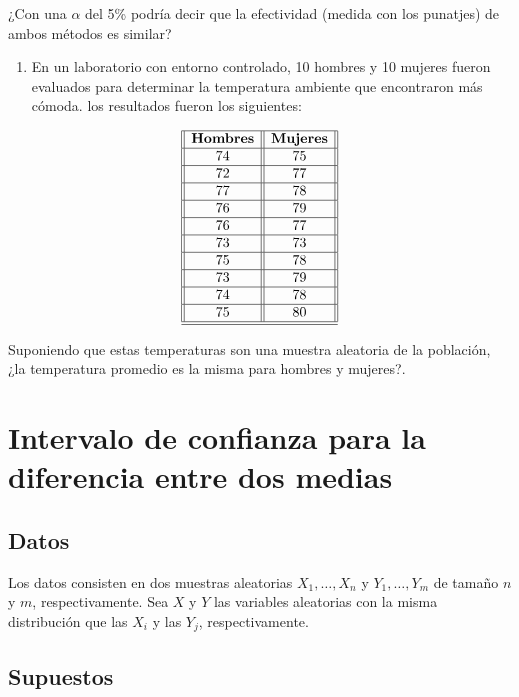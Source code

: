 \documentclass[
  a4paper,
  oneside,
  openany]{book}
\providecommand{\tightlist}{%
  \setlength{\itemsep}{0pt}\setlength{\parskip}{0pt}}
\begin{document}
¿Con una \(\alpha\) del 5\% podría decir que la efectividad (medida con los punatjes) de ambos métodos es similar?

\begin{enumerate}
\def\labelenumi{\arabic{enumi}.}
\setcounter{enumi}{1}
\tightlist
\item
  En un laboratorio con entorno controlado, 10 hombres y 10 mujeres fueron evaluados para determinar la temperatura ambiente que encontraron más cómoda. los resultados fueron los siguientes:
\end{enumerate}

\[
\begin{array}{||c| |c||} 
\hline 
\textbf{Hombres} & \textbf{Mujeres} \\  
 \hline
74&75\\
 \hline
72&77\\
 \hline
77&78\\
 \hline
76&79\\
 \hline
76&77\\
 \hline
73&73\\
 \hline
75&78\\
 \hline
73&79\\
 \hline
74&78\\
 \hline
75&80\\
  \hline
\hline
\end{array}
\]

Suponiendo que estas temperaturas son una muestra aleatoria de la población, ¿la temperatura promedio es la misma para hombres y mujeres?.

\hypertarget{intervalo-de-confianza-para-la-diferencia-entre-dos-medias}{%
\chapter{Intervalo de confianza para la diferencia entre dos medias}\label{intervalo-de-confianza-para-la-diferencia-entre-dos-medias}}

\hypertarget{datos-6}{%
\section{Datos}\label{datos-6}}

Los datos consisten en dos muestras aleatorias \(X_{1}, \ldots, X_{n}\) y \(Y_{1}, \ldots, Y_{m}\) de tamaño \(n\) y \(m\), respectivamente. Sea \(X\) y \(Y\) las variables aleatorias con la misma distribución que las \(X_{i}\) y las \(Y_{j}\), respectivamente.

\hypertarget{supuestos-6}{%
\section{Supuestos}\label{supuestos-6}}
\end{document}
